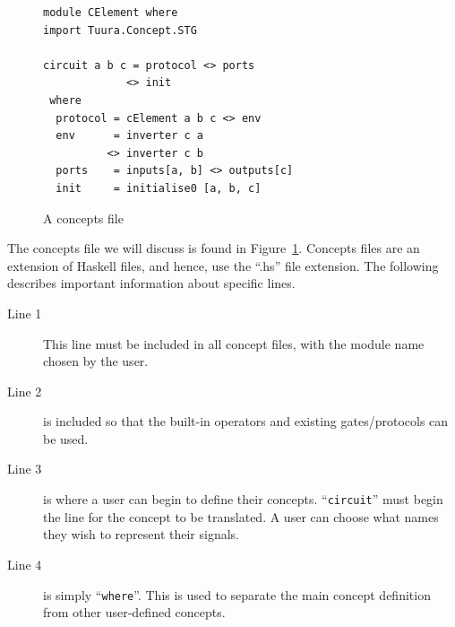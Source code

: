 \documentclass[british,conference,compsoc]{IEEEtran}
\begin{document}
\begin{figure}[h]
\begin{centering}
\vspace{-3mm}
\begin{verbatim}
module CElement where
import Tuura.Concept.STG

circuit a b c = protocol <> ports 
             <> init 
 where
  protocol = cElement a b c <> env
  env      = inverter c a 
          <> inverter c b
  ports    = inputs[a, b] <> outputs[c] 
  init     = initialise0 [a, b, c]
\end{verbatim}

\par\end{centering}
\vspace{-1mm}
\begin{centering}
\protect\caption{\label{fig:concepts_file}A concepts file}
\vspace{-3mm}
\par\end{centering}

\end{figure}

The concepts file we will discuss is found in Figure~\ref{fig:concepts_file}.
Concepts files are an extension of Haskell files, and hence, use the ``.hs'' file extension.
The following describes important information about specific lines.

\vspace{-1.5mm}

\begin{description}
  \item [Line 1]  This line must be included in all concept files, with the 
  module name chosen by the user.
  
  \item [Line 2] is included so that the built-in operators and existing 
  gates/protocols can be used. 
  
  \item [Line 3] is where a user can begin to define their concepts. 
  ``\texttt{circuit}'' must begin the line for the concept to be translated.
  A user can choose what names they wish to represent their signals.
  
  \item [Line 4] is simply ``\texttt{where}''. This is used to separate the main
  concept definition from other user-defined concepts.

\end{description}
\end{document}
